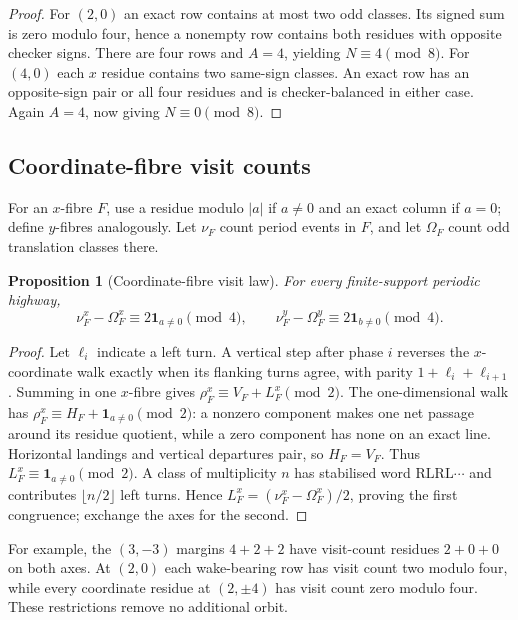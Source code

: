 \documentclass[11pt,letterpaper]{article}
\theoremstyle{plain}
\newtheorem{proposition}[theorem]{Proposition}
\theoremstyle{definition}
\newcommand{\turnR}{\mathrm{R}}
\newcommand{\turnL}{\mathrm{L}}
\begin{document}
\begin{NoHyper}
\begin{proof}
For $(2,0)$ an exact row contains at most two odd classes.  Its signed sum is
zero modulo four, hence a nonempty row contains both residues with opposite
checker signs.  There are four rows and $A=4$, yielding $N\equiv4\pmod8$.
For $(4,0)$ each $x$ residue contains two same-sign classes.  An exact row has
an opposite-sign pair or all four residues and is checker-balanced in either
case.  Again $A=4$, now giving $N\equiv0\pmod8$.
\end{proof}

\subsection{Coordinate-fibre visit counts}

For an $x$-fibre $F$, use a residue modulo $|a|$ if $a\ne0$ and an exact column
if $a=0$; define $y$-fibres analogously.  Let $\nu_F$ count period events in
$F$, and let $\Omega_F$ count odd translation classes there.

\begin{proposition}[Coordinate-fibre visit law]\label{prop:coordvisit}
For every finite-support periodic highway,
\begin{equation}\label{eq:coordvisit}
 \nu_F^x-\Omega_F^x\equiv2\mathbf1_{a\ne0}\pmod4,\qquad
 \nu_F^y-\Omega_F^y\equiv2\mathbf1_{b\ne0}\pmod4 .
\end{equation}
\end{proposition}

\begin{proof}
Let $\ell_i$ indicate a left turn.  A vertical step after phase $i$ reverses
the $x$-coordinate walk exactly when its flanking turns agree, with parity
$1+\ell_i+\ell_{i+1}$.  Summing in one $x$-fibre gives
$\rho_F^x\equiv V_F+L_F^x\pmod2$.  The one-dimensional walk has
$\rho_F^x\equiv H_F+\mathbf1_{a\ne0}\pmod2$: a nonzero component makes one net
passage around its residue quotient, while a zero component has none on an
exact line.  Horizontal landings and vertical departures pair, so $H_F=V_F$.
Thus $L_F^x\equiv\mathbf1_{a\ne0}\pmod2$.  A class of multiplicity $n$ has
stabilised word $\turnR\turnL\turnR\turnL\cdots$ and contributes
$\lfloor n/2\rfloor$ left turns.  Hence
$L_F^x=(\nu_F^x-\Omega_F^x)/2$, proving the first congruence; exchange the axes
for the second.
\end{proof}

For example, the $(3,-3)$ margins $4+2+2$ have visit-count residues $2+0+0$
on both axes.  At $(2,0)$ each wake-bearing row has visit count two modulo four,
while every coordinate residue at $(2,\pm4)$ has visit count zero modulo four.
These restrictions remove no additional orbit.


\end{NoHyper}
\end{document}
